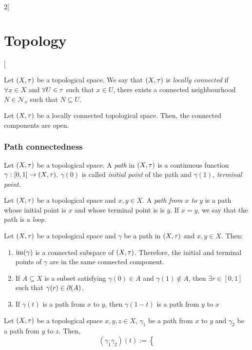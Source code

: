 \documentclass[../../../main.tex]{subfiles}
\begin{document}
\begin{multicols}{2}[\section{Topology}]
\begin{corollary}
    \end{corollary}
    \begin{definition}
        Let $(X,\tau)$ be a topological space. We say that $(X,\tau)$ is \emph{locally connected} if $\forall x\in X$ and $\forall U\in\tau$ such that $x\in U$, there exists a connected neighbourhood $N\in\mathcal{N}_x$ such that $N\subseteq U$.
    \end{definition}
    \begin{prop}
        Let $(X,\tau)$ be a locally connected topological space. Then, the connected components are open.
    \end{prop}
    \subsubsection{Path connectedness}
    \begin{definition}
        Let $(X,\tau)$ be a topological space. A \emph{path} in $(X,\tau)$ is a continuous function $\gamma:[0,1]\rightarrow (X,\tau)$. $\gamma(0)$ is called \emph{initial point} of the path and $\gamma(1)$, \emph{terminal point}.
    \end{definition}
    \begin{definition}
        Let $(X,\tau)$ be a topological space and $x,y\in X$. A \emph{path from $x$ to $y$} is a path whose initial point is $x$ and whose terminal point is is $y$. If $x=y$, we say that the path is a \emph{loop}.
    \end{definition}
    \begin{prop}
        Let $(X,\tau)$ be a topological space and $\gamma$ be a path in $(X,\tau)$ and $x,y\in X$. Then:
        \begin{enumerate}
            \item $\operatorname{im}(\gamma)$ is a connected subspace of $(X,\tau)$. Therefore, the initial and terminal points of $\gamma$ are in the same connected component.
            \item If $A\subseteq X$ is a subset satisfying $\gamma(0)\in A$ and $\gamma(1)\notin A$, then $\exists r\in[0,1]$ such that $\gamma(r)\in\operatorname{\partial}(A)$.
            \item If $\gamma(t)$ is a path from $x$ to $y$, then  $\gamma(1-t)$ is a path from $y$ to $x$
        \end{enumerate}
    \end{prop}
    \begin{prop}
        Let $(X,\tau)$ be a topological space $x,y,z\in X$, $\gamma_1$ be a path from $x$ to $y$ and $\gamma_2$ be a path from $y$ to $z$. Then, $$(\gamma_1\gamma_2)(t):=\left\{
$$
\end{prop}
\end{multicols}
\end{document}

